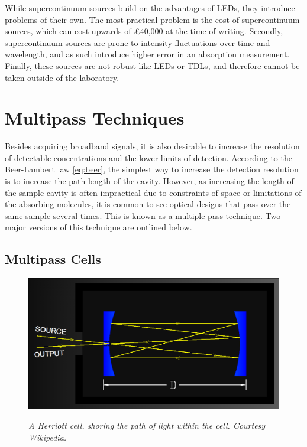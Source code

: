 While supercontinuum sources build on the advantages of \acp{LED}, they
introduce problems of their own. The most practical problem is the cost of
supercontinuum sources, which can cost upwards of \pounds40,000 at the time of
writing. Secondly, supercontinuum sources are prone to intensity fluctuations
over time and wavelength, and as such introduce higher error in an absorption
measurement.  Finally, these sources are not robust like \acp{LED} or
\acp{TDL}, and therefore cannot be taken outside of the laboratory.



\section{Multipass Techniques}\label{sec:multipass}

Besides acquiring broadband signals, it is also desirable to increase the
resolution of detectable concentrations and the lower limits of detection.
According to the Beer-Lambert law \eqref{eq:beer}, the simplest way to increase
the detection resolution is to increase the path length of the cavity. However,
as increasing the length of the sample cavity is often impractical due to
constraints of space or limitations of the absorbing molecules, it is common to
see optical designs that pass over the same sample several times. This is known
as a multiple pass technique. Two major versions of this technique are outlined
below.



\subsection{Multipass Cells}\label{subsec:herriott}


\begin{figure}
\begin{center}
  \includegraphics[width=\marginspace]{figures/herriott.png}
\end{center}
\emph{\footnotesize{A Herriott cell, shoring the path of light within the cell. Courtesy Wikipedia.}}
\end{figure}

